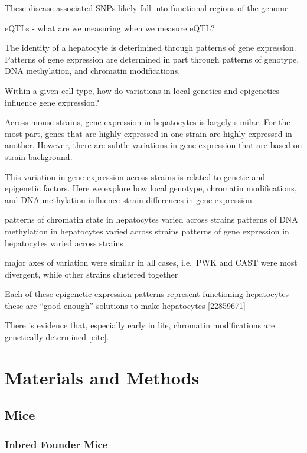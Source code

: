 \documentclass[10pt,letterpaper]{article}
\begin{document}
These disease-associated SNPs likely fall into functional regions of the
genome

eQTLs - what are we measuring when we measure eQTL?

The identity of a hepatocyte is deterimined through patterns of gene
expression. Patterns of gene expression are determined in part through
patterns of genotype, DNA methylation, and chromatin modifications.

Within a given cell type, how do variations in local genetics and
epigenetics influence gene expression?

Across mouse strains, gene expression in hepatocytes is largely similar.
For the most part, genes that are highly expressed in one strain are
highly expressed in another. However, there are subtle variations in
gene expression that are based on strain background.

This variation in gene expression across strains is related to genetic
and epigenetic factors. Here we explore how local genotype, chromatin
modifications, and DNA methylation influence strain differences in gene
expression.

patterns of chromatin state in hepatocytes varied across strains
patterns of DNA methylation in hepatocytes varied across strains
patterns of gene expression in hepatocytes varied across strains

major axes of variation were similar in all cases, i.e.~PWK and CAST
were most divergent, while other strains clustered together

Each of these epigenetic-expression patterns represent functioning
hepatocytes these are ``good enough'' solutions to make hepatocytes
{[}22859671{]}

There is evidence that, especially early in life, chromatin
modifications are genetically determined {[}cite{]}.

\hypertarget{materials-and-methods}{%
\section{Materials and Methods}\label{materials-and-methods}}

\hypertarget{mice}{%
\subsection{Mice}\label{mice}}

\hypertarget{inbred-founder-mice}{%
\subsubsection{Inbred Founder Mice}\label{inbred-founder-mice}}
\end{document}
